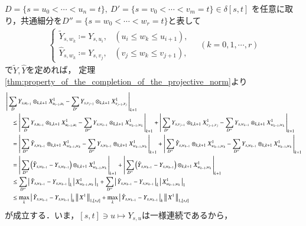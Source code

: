 	\begin{prf}
		$D=\{s=u_0 < \cdots <u_n= t\},\ D'=\{s=v_0 < \cdots <v_m= t\} \in \delta[s,t]$
		を任意に取り，共通細分を$D''=\{s=w_0 < \cdots < w_r = t\}$と表して
		\begin{align}
			\begin{cases}
				\tilde{Y}_{s,w_k} \coloneqq Y_{s,u_i}, & (u_i \leq w_k \leq u_{i+1}), \\
				\hat{Y}_{s,w_k} \coloneqq Y_{s,v_j}, & (v_j \leq w_k \leq v_{j+1}),
			\end{cases}
			\quad (k=0,1,\cdots,r)
		\end{align}
		で$\tilde{Y},\hat{Y}$を定めれば，
		定理\ref{thm:property_of_the_completion_of_the_projective_norm}より
		\begin{align}
			&\left|\,  \sum_D Y_{s,u_{i-1}} \otimes_{k,k+1} X^1_{u_{i-1},u_i} - 
				\sum_{D'} Y_{s,v_{j-1}} \otimes_{k,k+1} X^1_{v_{j-1},v_j}\, \right|_{k+1} \\
			&\quad\leq \left|\,  \sum_D Y_{s,u_{i-1}} \otimes_{k,k+1} X^1_{u_{i-1},u_i} - 
				\sum_{D''} Y_{s,w_{k-1}} \otimes_{k,k+1} X^1_{w_{k-1},w_k}\, \right|_{k+1}
				+ \left|\,  \sum_{D'} Y_{s,v_{j-1}} \otimes_{k,k+1} X^1_{v_{j-1},v_j} - 
				\sum_{D''} Y_{s,w_{k-1}} \otimes_{k,k+1} X^1_{w_{k-1},w_k}\, \right|_{k+1} \\
			&\quad= \left|\,  \sum_{D''} \tilde{Y}_{s,w_{k-1}} \otimes_{k,k+1} X^1_{w_{k-1},w_k} - 
				\sum_{D''} Y_{s,w_{k-1}} \otimes_{k,k+1} X^1_{w_{k-1},w_k}\, \right|_{k+1} 
				+ \left|\,  \sum_{D''} \hat{Y}_{s,w_{k-1}} \otimes_{k,k+1} X^1_{w_{k-1},w_k} - 
				\sum_{D''} Y_{s,w_{k-1}} \otimes_{k,k+1} X^1_{w_{k-1},w_k}\, \right|_{k+1} \\
			&\quad= \left|\,  \sum_{D''} \left(\tilde{Y}_{s,w_{k-1}} - Y_{s,w_{k-1}} \right)
		 		\otimes_{k,k+1} X^1_{w_{k-1},w_k}\, \right|_{k+1}
				+ \left|\,  \sum_{D''} \left( \hat{Y}_{s,w_{k-1}} - Y_{s,w_{k-1}} \right)
				\otimes_{k,k+1} X^1_{w_{k-1},w_k}\, \right|_{k+1} \\
			&\quad\leq \sum_{D''} \left|\, \tilde{Y}_{s,w_{k-1}} - Y_{s,w_{k-1}}\, \right|_{k} \left|\, X^1_{w_{k-1},w_k}\, \right|_{1}
				+ \sum_{D''} \left|\, \hat{Y}_{s,w_{k-1}} - Y_{s,w_{k-1}}\, \right|_{k} \left|\, X^1_{w_{k-1},w_k}\, \right|_{1} \\
			&\quad\leq \operatorname*{max}_{k} \left|\, \tilde{Y}_{s,w_{k-1}} - Y_{s,w_{k-1}}\, \right|_{k} 
				\left\|\, X^1\, \right\|_{1,[s,t]} + \operatorname*{max}_{k} \left|\, \hat{Y}_{s,w_{k-1}} - Y_{s,w_{k-1}}\, \right|_{k} \left\|\, X^1\, \right\|_{1,[s,t]}
		\end{align}
		が成立する．いま，$[s,t] \ni u \longmapsto Y_{s,u}$は一様連続であるから，

\end{prf}
